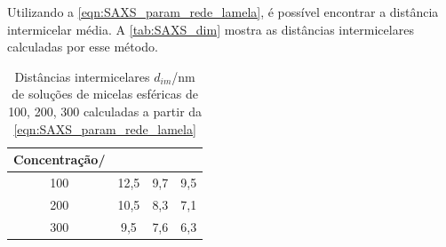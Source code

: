 	Utilizando a \autoref{eqn:SAXS_param_rede_lamela}, é possível encontrar a distância intermicelar média. A \autoref{tab:SAXS_dim} mostra as distâncias intermicelares calculadas por esse método.
	
	
		\begin{table}[h]
		\IBGEtab%
		{\caption{Distâncias intermicelares \(d_{im}\)/nm de soluções de micelas esféricas de \CTDTAB{} 100, 200, 300 \mM{} calculadas a partir da \autoref{eqn:SAXS_param_rede_lamela}}
			\label{tab:SAXS_dim}}%
		{\begin{tabular}{c | c c c}
			\toprule
			Concentração/\mM & \CTAB  & \TTAB & \DTAB  \\ \midrule
			    100      & 12,5 & 9,7 & 9,5 \\
			    200      & 10,5 & 8,3 & 7,1 \\
			    300      & 9,5 & 7,6 & 6,3 \\ \bottomrule
		\end{tabular}}%
		{}
	\end{table}
	
